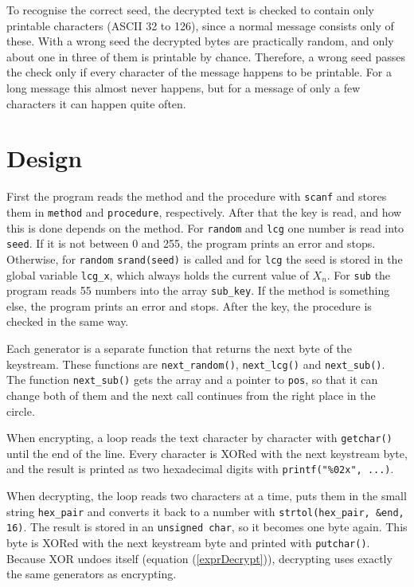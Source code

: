 \documentclass[a4paper,10pt]{article}
\begin{document}
To recognise the correct seed, the decrypted text is checked to contain only printable characters (ASCII 32 to 126), since a normal message consists only of these. With a wrong seed the decrypted bytes are practically random, and only about one in three of them is printable by chance. Therefore, a wrong seed passes the check only if every character of the message happens to be printable. For a long message this almost never happens, but for a message of only a few characters it can happen quite often.

 
\section{Design}
First the program reads the method and the procedure with {\tt scanf} and stores them in {\tt method} and {\tt procedure}, respectively. After that the key is read, and how this is done depends on the method.
For {\tt random} and {\tt lcg} one number is read into {\tt seed}. If it is not between 0 and 255, the program prints an error and stops. Otherwise, for {\tt random} {\tt srand(seed)} is called and for {\tt lcg} the seed is stored in the global variable {\tt lcg\_x}, which always holds the current value of $X_n$.
For {\tt sub} the program reads 55 numbers into the array {\tt sub\_key}.
If the method is something else, the program prints an error and stops. After the key, the procedure is checked in the same way.
 
Each generator is a separate function that returns the next byte of the keystream. These functions are {\tt next\_random()}, {\tt next\_lcg()} and {\tt next\_sub()}. The function {\tt next\_sub()} gets the array and a pointer to {\tt pos}, so that it can change both of them and the next call continues from the right place in the circle.
 
When encrypting, a loop reads the text character by character with {\tt getchar()} until the end of the line. Every character is XORed with the next keystream byte, and the result is printed as two hexadecimal digits with {\tt printf("\%02x", ...)}.
 
When decrypting, the loop reads two characters at a time, puts them in the small string {\tt hex\_pair} and converts it back to a number with {\tt strtol(hex\_pair, \&end, 16)}. The result is stored in an {\tt unsigned char}, so it becomes one byte again. This byte is XORed with the next keystream byte and printed with {\tt putchar()}. Because XOR undoes itself (equation (\ref{exprDecrypt})), decrypting uses exactly the same generators as encrypting.
\end{document}
